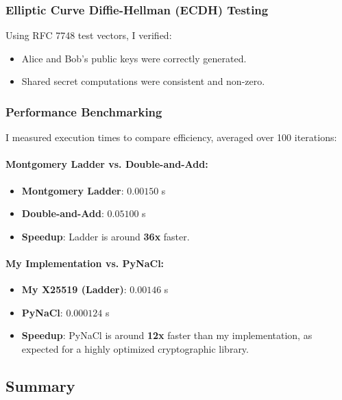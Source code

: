 \documentclass[twoside,a4paper,12pt]{article}
\begin{document}
\subsubsection{Elliptic Curve Diffie-Hellman (ECDH) Testing}

Using RFC 7748 test vectors, I verified:
\begin{itemize}
    \item Alice and Bob's public keys were correctly generated.
    \item Shared secret computations were consistent and non-zero.
\end{itemize}

\subsubsection{Performance Benchmarking}

I measured execution times to compare efficiency, averaged over 100 iterations:

\paragraph{Montgomery Ladder vs. Double-and-Add:}
\begin{itemize}
    \item \textbf{Montgomery Ladder}: \( 0.00150 \) s
    \item \textbf{Double-and-Add}: \( 0.05100 \) s
    \item \textbf{Speedup}: Ladder is around \textbf{36x} faster.
\end{itemize}

\paragraph{My Implementation vs. PyNaCl:}
\begin{itemize}
    \item \textbf{My X25519 (Ladder)}: \( 0.00146 \) s
    \item \textbf{PyNaCl}: \( 0.000124 \) s
    \item \textbf{Speedup}: PyNaCl is around \textbf{12x} faster than my implementation, as expected for a highly optimized cryptographic library.
\end{itemize}

\subsection{Summary}
\end{document}
